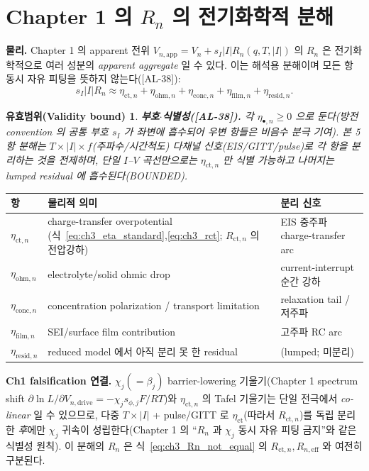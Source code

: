 \documentclass[11pt,a4paper]{article}
\newtheorem*{boundbox}{유효범위(Validity bound)}
\newcommand{\eff}{\mathrm{eff}}
\newcommand{\app}{\mathrm{app}}
\newcommand{\drive}{\mathrm{drive}}
\newcommand{\ct}{\mathrm{ct}}
\newcommand{\resid}{\mathrm{resid}}
\newcommand{\ohm}{\mathrm{ohm}}
\newcommand{\conc}{\mathrm{conc}}
\newcommand{\film}{\mathrm{film}}
\newcommand{\AL}[1]{\textsf{[AL-#1]}}
\begin{document}
\section{Chapter 1 의 $R_n$ 의 전기화학적 분해}\label{sec:ch3_Rn}
\textbf{물리.} Chapter 1 의 apparent 전위 $V_{n,\app}=V_n+s_I|I|R_n(q,T,|I|)$ 의 $R_n$ 은 전기화학적으로 여러
성분의 \emph{apparent aggregate} 일 수 있다. 이는 해석용 분해이며 모든 항 동시 자유 피팅을 뜻하지 않는다(\AL{38}):
\begin{equation}
s_I|I|R_n\approx\eta_{\ct,n}+\eta_{\ohm,n}+\eta_{\conc,n}+\eta_{\film,n}+\eta_{\resid,n}.
\label{eq:ch3_Rn_decomp}
\end{equation}
\begin{boundbox}
\textbf{부호$\cdot$식별성(\AL{38}).} 각 $\eta_{\bullet,n}\ge0$ 으로 둔다(방전 convention 의 공통 부호 $s_I$ 가
좌변에 흡수되어 우변 항들은 비음수 분극 기여). 본 5항 분해는 $T\times|I|\times f$(주파수/시간척도) 다채널
신호(EIS/GITT/pulse)로 각 항을 \emph{분리}하는 것을 전제하며, 단일 $I$--$V$ 곡선만으로는 $\eta_{\ct,n}$ 만
식별 가능하고 나머지는 lumped residual 에 흡수된다(BOUNDED).
\end{boundbox}
\begin{longtable}{p{} >{\raggedright\arraybackslash}p{} >{\raggedright\arraybackslash}p{}}
\toprule 항 & 물리적 의미 & 분리 신호 \\ \midrule \endhead
$\eta_{\ct,n}$ & charge-transfer overpotential (식~\eqref{eq:ch3_eta_standard},\allowbreak\eqref{eq:ch3_rct}; $R_{\ct,n}$ 의 전압강하) & EIS 중주파 charge-transfer arc \\
$\eta_{\ohm,n}$ & electrolyte/solid ohmic drop & current-interrupt 순간 강하 \\
$\eta_{\conc,n}$ & concentration polarization / transport limitation & relaxation tail / 저주파 \\
$\eta_{\film,n}$ & SEI/surface film contribution & 고주파 RC arc \\
$\eta_{\resid,n}$ & reduced model 에서 아직 분리 못 한 residual & (lumped; 미분리) \\
\bottomrule
\end{longtable}
\textbf{Ch1 falsification 연결.} $\chi_j(=\beta_j)$ barrier-lowering 기울기(Chapter 1 spectrum shift
$\partial\ln L/\partial V_{n,\drive}=-\chi_j s_{\phi,j}F/RT$)와 $\eta_{\ct,n}$ 의 Tafel 기울기는 단일 전극에서
\emph{co-linear} 일 수 있으므로, 다중 $T\times|I|$ + pulse/GITT 로 $\eta_{\ct}$(따라서 $R_{\ct,n}$)를 독립
분리한 \emph{후}에만 $\chi_j$ 귀속이 성립한다(Chapter 1 의 ``$R_n$ 과 $\chi_j$ 동시 자유 피팅 금지''와 같은
식별성 원칙). 이 분해의 $R_n$ 은 식~\eqref{eq:ch3_Rn_not_equal} 의 $R_{\ct,n},R_{n,\eff}$ 와 여전히 구분된다.
\end{document}
